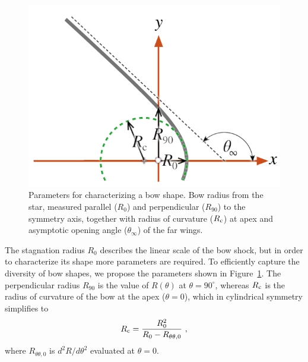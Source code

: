 \begin{figure}
  \centering
  \includegraphics[width=\linewidth]{figs/characteristic-radii}
  \caption{Parameters for characterizing a bow shape.  Bow radius from
    the star, measured parallel (\(R_0\)) and perpendicular
    (\(R_{90}\)) to the symmetry axis, together with radius of
    curvature (\(R_{\mathrm{c}}\)) at apex and asymptotic opening angle
    (\(\theta_\infty\)) of the far wings. }
  \label{fig:characteristic-radii}
\end{figure}

The stagnation radius \(R_0\) describes the linear scale of the bow
shock, but in order to characterize its shape more parameters are
required.  To efficiently capture the diversity of bow shapes, we
propose the parameters shown in Figure~\ref{fig:characteristic-radii}.
The perpendicular radius \(R_{90}\) is the value of \(R(\theta)\) at
\(\theta = 90^\circ\), whereas \(R_{\mathrm{c}}\) is the radius of curvature of the bow at
the apex (\(\theta = 0\)), which in cylindrical symmetry simplifies to
\begin{equation}
  \label{eq:radius-curvature}
  R_{\mathrm{c}} 
  = \frac{R_0^2}{R_0 - R_{\theta\theta,0}} \ , 
\end{equation}
where \(R_{\theta\theta,0}\) is \(d^2 \!R / d\theta^2\) evaluated at \(\theta = 0\).

